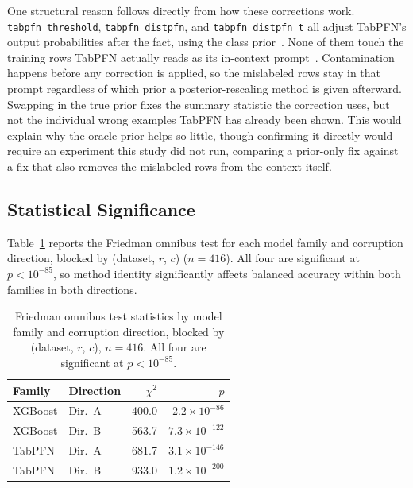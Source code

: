 One structural reason follows directly from how these corrections work. \texttt{tabpfn\_threshold}, \texttt{tabpfn\_distpfn}, and
\texttt{tabpfn\_distpfn\_t} all adjust TabPFN's output probabilities after
the fact, using the class prior~\cite{saerens2002adjusting,lee2026distpfn}.
None of them touch the training rows TabPFN actually reads as its
in-context prompt~\cite{hollmann2023tabpfn,hollmann2025tabpfnv2}.
Contamination happens before any correction is applied, so the mislabeled
rows stay in that prompt regardless of which prior a posterior-rescaling
method is given afterward. Swapping in the true prior fixes the summary
statistic the correction uses, but not the individual wrong examples
TabPFN has already been shown. This would explain why the oracle prior
helps so little, though confirming it directly would require an
experiment this study did not run, comparing a prior-only fix against a
fix that also removes the mislabeled rows from the context itself.

\subsection{Statistical Significance}
\label{sec:results-significance}

Table~\ref{tab:friedman} reports the Friedman omnibus test for each model
family and corruption direction, blocked by (dataset, $r$, $c$)
($n{=}416$). All four are significant at $p<10^{-85}$,
so method identity significantly affects balanced accuracy within both
families in both directions.

\begin{table}[t]
\centering
\caption{Friedman omnibus test statistics by model family and corruption
direction, blocked by (dataset, $r$, $c$), $n{=}416$. All four are
significant at $p<10^{-85}$.}
\label{tab:friedman}
\begin{tabular}{@{}llrr@{}}
\toprule
Family & Direction & $\chi^2$ & $p$ \\
\midrule
XGBoost & Dir.\ A & 400.0 & $2.2\times10^{-86}$ \\
XGBoost & Dir.\ B & 563.7 & $7.3\times10^{-122}$ \\
TabPFN  & Dir.\ A & 681.7 & $3.1\times10^{-146}$ \\
TabPFN  & Dir.\ B & 933.0 & $1.2\times10^{-200}$ \\
\bottomrule
\end{tabular}
\end{table}

